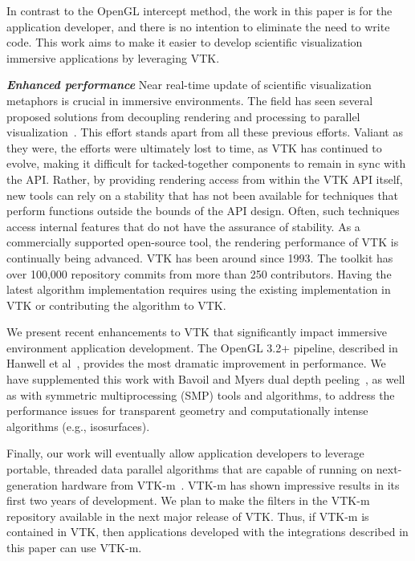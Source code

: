 In contrast to the OpenGL intercept method, the work in this paper is for the application developer, and there is no intention to eliminate the need to write code. This work aims to make  it easier to develop scientific visualization immersive applications by leveraging VTK.

\textit{\textbf{Enhanced performance}} Near real-time update of scientific visualization metaphors is crucial in immersive environments.
The field has seen several proposed solutions from decoupling rendering and processing to parallel visualization~\cite{Bryson:1996, van2000vista}.
This effort stands apart from all these previous efforts. Valiant
as they were, the efforts were ultimately lost to time, as VTK has continued to
evolve, making it difficult for tacked-together components to remain in
sync with the API.
Rather, by providing rendering access from within the VTK API itself, new
tools can rely on a stability that has not been available for techniques
that perform functions outside the bounds of the API design. Often, such techniques access
internal features that do not have the assurance of stability.
As a commercially supported open-source tool, the rendering performance of VTK is
continually being advanced.
VTK has been around since 1993. The toolkit has over 100,000 repository commits from more than 250 contributors.
Having the latest algorithm implementation requires using the existing implementation in VTK or contributing the algorithm to VTK.

We present recent enhancements to VTK that significantly impact immersive
environment application development. The OpenGL 3.2+ pipeline, described in Hanwell et al~\cite{Hanwell:2015}, provides the most dramatic improvement in performance. We have supplemented this work with Bavoil and Myers dual depth peeling~\cite{Bavoil:2008}, as well as with symmetric multiprocessing (SMP) tools and algorithms, to address the performance issues for transparent geometry and computationally intense algorithms (e.g., isosurfaces).

Finally, our work will eventually allow application developers to leverage portable, threaded data parallel algorithms that are capable of running on next-generation hardware from VTK-m~\cite{Moreland:2016}. VTK-m has shown impressive results in its first two years of development. We plan to make the filters in the VTK-m repository available in the next major release of VTK. Thus, if VTK-m is contained in VTK, then applications developed with the integrations described in this paper can use VTK-m.
